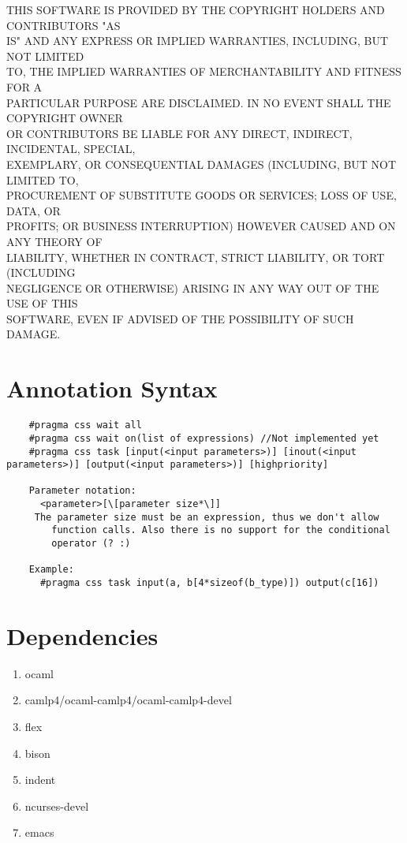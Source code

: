 \documentclass[letterpaper]{article}
\begin{document}
THIS SOFTWARE IS PROVIDED BY THE COPYRIGHT HOLDERS AND CONTRIBUTORS "AS\\
IS" AND ANY EXPRESS OR IMPLIED WARRANTIES, INCLUDING, BUT NOT LIMITED\\
TO, THE IMPLIED WARRANTIES OF MERCHANTABILITY AND FITNESS FOR A\\
PARTICULAR PURPOSE ARE DISCLAIMED. IN NO EVENT SHALL THE COPYRIGHT OWNER\\
OR CONTRIBUTORS BE LIABLE FOR ANY DIRECT, INDIRECT, INCIDENTAL, SPECIAL,\\
EXEMPLARY, OR CONSEQUENTIAL DAMAGES (INCLUDING, BUT NOT LIMITED TO,\\
PROCUREMENT OF SUBSTITUTE GOODS OR SERVICES; LOSS OF USE, DATA, OR\\
PROFITS; OR BUSINESS INTERRUPTION) HOWEVER CAUSED AND ON ANY THEORY OF\\
LIABILITY, WHETHER IN CONTRACT, STRICT LIABILITY, OR TORT (INCLUDING\\
NEGLIGENCE OR OTHERWISE) ARISING IN ANY WAY OUT OF THE USE OF THIS\\
SOFTWARE, EVEN IF ADVISED OF THE POSSIBILITY OF SUCH DAMAGE.\\

\section{Annotation Syntax}

\begin{verbatim}
    #pragma css wait all
    #pragma css wait on(list of expressions) //Not implemented yet
    #pragma css task [input(<input parameters>)] [inout(<input parameters>)] [output(<input parameters>)] [highpriority]

    Parameter notation:
      <parameter>[\[parameter size*\]]
     The parameter size must be an expression, thus we don't allow
        function calls. Also there is no support for the conditional
        operator (? :)

    Example:
      #pragma css task input(a, b[4*sizeof(b_type)]) output(c[16])
\end{verbatim}


\section{Dependencies}

\begin{enumerate}
  \item ocaml
  \item camlp4/ocaml-camlp4/ocaml-camlp4-devel
  \item flex
  \item bison
  \item indent
  \item ncurses-devel
  \item emacs
\end{enumerate}
\end{document}
